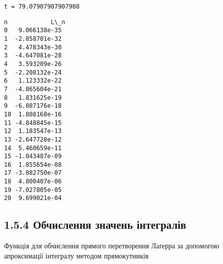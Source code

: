 \documentclass[11pt]{article}
\makeatletter
\newcommand{\boxspacing}{\kern\kvtcb@left@rule\kern\kvtcb@boxsep}
\newcommand{\prompt}[4]{
        {\ttfamily\llap{{\color{#2}[#3]:\hspace{3pt}#4}}\vspace{-\baselineskip}}
    }
\makeatother
\begin{document}
\begin{Verbatim}[commandchars=\\\{\}]
t = 79.07907907907908
\end{Verbatim}

\begin{tcolorbox}[breakable, size=fbox, boxrule=.5pt, pad at break*=1mm, opacityfill=0]
	\prompt{Out}{outcolor}{201}{\boxspacing}
	\begin{Verbatim}[commandchars=\\\{\}]
n            L\_n
0   9.066138e-35
1  -2.858701e-32
2   4.478343e-30
3  -4.647081e-28
4   3.593209e-26
5  -2.208132e-24
6   1.123332e-22
7  -4.865604e-21
8   1.831625e-19
9  -6.087176e-18
10  1.808168e-16
11 -4.848845e-15
12  1.183547e-13
13 -2.647728e-12
14  5.460659e-11
15 -1.043487e-09
16  1.855654e-08
17 -3.082750e-07
18  4.800407e-06
19 -7.027805e-05
20  9.699021e-04
	\end{Verbatim}
\end{tcolorbox}
        
    
\newpage
\subsection*{1.5.4 Обчислення значень
	інтегралів}\label{ux43eux431ux447ux438ux441ux43bux435ux43dux43dux44f-ux437ux43dux430ux447ux435ux43dux44c-ux456ux43dux442ux435ux433ux440ux430ux43bux456ux432}

Функція для обчислення прямого перетворення Лаґерра за допомогою
апроксимації інтегралу методом прямокутників
\end{document}
